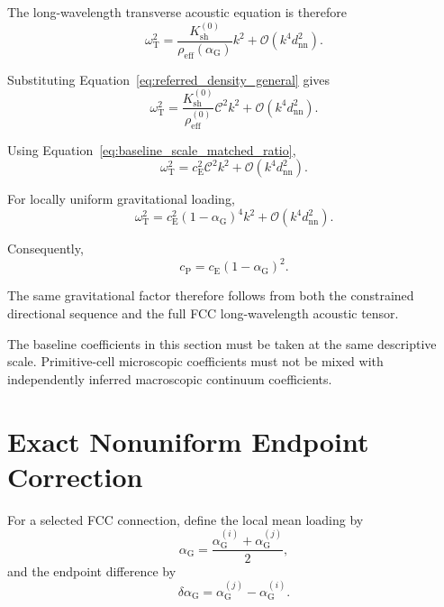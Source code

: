The long-wavelength transverse acoustic equation is therefore
\begin{equation}
    \omega_{\mathrm{T}}^2 = \frac{ K_{\mathrm{sh}}^{(0)} }{ \rho_{\mathrm{eff}} \left( \alpha_{\mathrm{G}} \right) } k^2 + \mathcal{O} \left( k^4d_{\mathrm{nn}}^2 \right).
\end{equation}

Substituting Equation~\eqref{eq:referred_density_general} gives
\begin{equation}
    \omega_{\mathrm{T}}^2 = \frac{ K_{\mathrm{sh}}^{(0)} }{ \rho_{\mathrm{eff}}^{(0)} } \mathcal{C}^2k^2 + \mathcal{O} \left( k^4d_{\mathrm{nn}}^2 \right).
\end{equation}

Using Equation~\eqref{eq:baseline_scale_matched_ratio},
\begin{equation}
    \omega_{\mathrm{T}}^2 = c_{\mathrm{E}}^2 \mathcal{C}^2k^2 + \mathcal{O} \left( k^4d_{\mathrm{nn}}^2 \right).
    \label{eq:fcc_constrained_transverse_dispersion}
\end{equation}

For locally uniform gravitational loading,
\begin{equation}
    \omega_{\mathrm{T}}^2 = c_{\mathrm{E}}^2 \left( 1-\alpha_{\mathrm{G}} \right)^4 k^2 + \mathcal{O} \left( k^4d_{\mathrm{nn}}^2 \right).
    \label{eq:fcc_alpha_dispersion}
\end{equation}

Consequently,
\begin{equation}
    c_{\mathrm{P}} = c_{\mathrm{E}} \left( 1-\alpha_{\mathrm{G}} \right)^2.
\end{equation}

The same gravitational factor therefore follows from both the constrained directional sequence and the full FCC long-wavelength acoustic tensor.

The baseline coefficients in this section must be taken at the same descriptive scale. Primitive-cell microscopic coefficients must not be mixed with independently inferred macroscopic continuum coefficients.

\section{Exact Nonuniform Endpoint Correction}
\label{sec:grav_nonuniform_endpoint}

For a selected FCC connection, define the local mean loading by
\begin{equation}
    \alpha_{\mathrm{G}} = \frac{ \alpha_{\mathrm{G}}^{(i)} + \alpha_{\mathrm{G}}^{(j)} }{2},
\end{equation}
and the endpoint difference by
\begin{equation}
    \delta\alpha_{\mathrm{G}} = \alpha_{\mathrm{G}}^{(j)} - \alpha_{\mathrm{G}}^{(i)}.
\end{equation}

